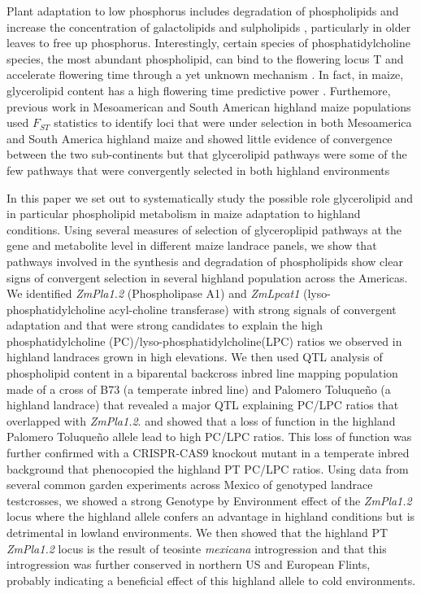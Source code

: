 \documentclass[9pt,twocolumn,twoside,lineno]{gsajnl}
\begin{document}
Plant adaptation to low phosphorus includes degradation of phospholipids and increase the concentration of galactolipids and sulpholipids \cite{Lambers2012-an}, particularly in older leaves to free up phosphorus. 
Interestingly, certain species of phosphatidylcholine species, the most abundant phospholipid, can bind to the flowering locus T and accelerate flowering time through a yet unknown mechanism \cite{Nakamura2014-qf}. 
In fact, in maize, glycerolipid content has a high flowering time predictive power \cite{Riedelsheimer2013-bd}. 
Furthemore, previous work in Mesoamerican and South American highland maize populations 
used $F_{ST}$ statistics to identify loci that were under selection in both Mesoamerica and South America highland maize and showed little evidence of convergence between the two sub-continents but that glycerolipid pathways were some of the few pathways that were convergently selected in both highland environments  \citep{Takuno2015-uj}

In this paper we set out to systematically study the possible role glycerolipid and in particular phospholipid metabolism in maize adaptation to highland conditions. 
Using several measures of selection of glyceroplipid pathways at the gene and metabolite level in different maize landrace panels, we show that pathways involved in the synthesis and degradation of phospholipids show clear signs of convergent selection in several highland population across the Americas. 
We identified \textit{ZmPla1.2} (Phospholipase A1) and \textit{ZmLpcat1} (lyso-phosphatidylcholine acyl-choline transferase) with strong signals of convergent adaptation and that were strong candidates to explain the high phosphatidylcholine (PC)/lyso-phosphatidylcholine(LPC) ratios we observed in highland landraces grown in high elevations. 
We then used QTL analysis of phospholipid content in a biparental backcross inbred line mapping population made of a cross of B73 (a temperate inbred line)  and Palomero Toluqueño (a highland landrace) that revealed a major QTL explaining PC/LPC ratios that overlapped with \textit{ZmPla1.2}. and showed that a loss of function in the highland Palomero Toluqueño allele lead to high PC/LPC ratios. 
This loss of function was further confirmed with a CRISPR-CAS9 knockout mutant in a temperate inbred background that phenocopied the highland PT PC/LPC ratios. 
Using data from several common garden experiments across Mexico of genotyped landrace testcrosses, we showed a strong Genotype by Environment effect of the \textit{ZmPla1.2} locus where the highland allele confers an advantage in highland conditions but is detrimental in lowland environments. 
We then showed that the highland PT \textit{ZmPla1.2} locus is the result of teosinte \textit{mexicana} introgression and that this introgression was further conserved in northern US and European Flints, probably indicating a beneficial effect of this highland allele to cold environments. 
\end{document}
